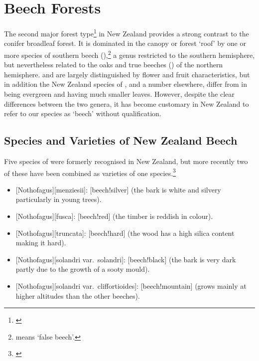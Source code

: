 \chapter{Beech Forests}%
\label{ch:beechforests}

The second major forest type\footnote{\cite{wardle1984beeches}} in New Zealand provides a strong contrast to the conifer broadleaf forest.
It is dominated in the canopy or forest `roof' by one or more species of southern beech (),\footnote{ means `false beech'.} a genus restricted to the southern hemisphere, but nevertheless related to the oaks and true beeches () of the northern hemisphere.  and  are largely distinguished by flower and fruit characteristics, but in addition the New Zealand species of , and a number elsewhere, differ from  in being evergreen and having much smaller leaves.
However, despite the clear differences between the two genera, it has become customary in New Zealand to refer to our species as `beech' without qualification.

\section{Species and Varieties of New Zealand Beech}

Five species of  were formerly recognised in New Zealand, but more recently two of these have been combined as varieties of one species.\footnote{\cite{poole1958studies}}

\begin{itemize}
	\item {}[Nothofagus][menziesii]: [beech!silver] (the bark is white and silvery particularly in young trees).
	\item {}[Nothofagus][fusca]: [beech!red] (the timber is reddish in colour).
	\item {}[Nothofagus][truncata]: [beech!hard] (the wood has a high silica content making it hard).
	\item {}[Nothofagus][solandri var.\ solandri]: [beech!black] (the bark is very dark partly due to the growth of a sooty mould).
	\item {}[Nothofagus][solandri var.\ cliffortioides]: [beech!mountain] (grows mainly at higher altitudes than the other beeches).
\end{itemize}

